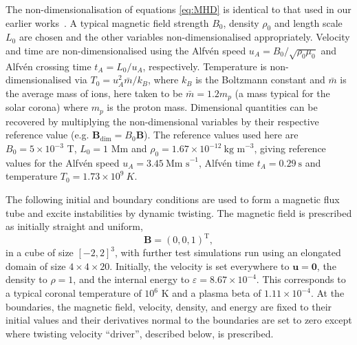 \documentclass[fleqn,usenatbib]{mnras}
\renewcommand{\vec}[1]{{\bm #1}}
\begin{document}
The non-dimensionalisation of equations \eqref{eq:MHD} is identical to that
used in our earlier
works~\citep{quinnEffectAnisotropicViscosity2020,quinnKelvinHelmholtzInstabilityCollapse2021}.
A typical magnetic field strength $B_0$, density $\rho_0$ and length scale
$L_0$ are chosen and the other variables non-dimensionalised appropriately.
Velocity and time are non-dimensionalised using the Alfv\'en speed $u_A = B_0
/ \sqrt{\rho_0 \mu_0}$ and Alfv\'en crossing time $t_A = L_0/u_A$,
respectively. Temperature is non-dimensionalised via $T_0 = u_A^2 \bar{m}
/ k_B$, where $k_B$ is the Boltzmann constant and $\bar{m}$ is the average mass
of ions, here taken to be $\bar{m} = 1.2m_p$ (a mass typical for the solar
corona) where $m_p$ is the proton mass. Dimensional quantities can be recovered
by multiplying the non-dimensional variables by their respective reference
value (e.g. $\vec{B}_{\dim} = B_0 \vec{B}$). The reference values used here are
$B_0 = 5 \times 10^{-3}$ T, $L_0 = 1$ Mm and $\rho_0 = 1.67 \times 10^{-12}
\ \text{kg m}^{-3}$, giving reference values for the Alfv\'en speed $u_A
= 3.45\ \text{Mm s}^{-1}$, Alfv\'en time $t_A =
0.29\ \text{s}$ and temperature $T_0 = 1.73 \times 10^{9}\ K$.      

The following initial and boundary conditions are used to form a magnetic flux
tube and excite instabilities by dynamic twisting. The magnetic field is
prescribed as initially straight and uniform,
\begin{equation}
\vec{B} = (0, 0, 1)^{\text{T}},
\end{equation}
in a cube of size $[-2,2]^3$, with further test simulations run using an
elongated domain of size $4\times4\times20$. Initially, the velocity is set
everywhere to $\vec{u} = \vec{0}$, the density to $\rho = 1$, and the internal
energy to $\varepsilon = 8.67\times 10^{-4}$. This corresponds to a typical
coronal temperature of $10^6$ K and a plasma beta of $1.11 \times 10^{-4}$. At
the boundaries, the magnetic field, velocity, density, and energy are fixed to
their initial values and their derivatives normal to the boundaries are set to
zero  except where twisting velocity ``driver'', described below, is
prescribed.
\end{document}
